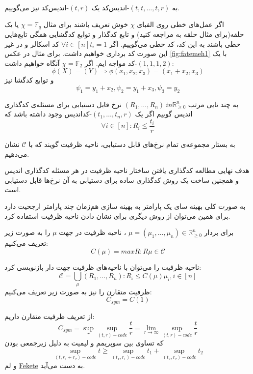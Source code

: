	به 
	$(t, t, \ldots, t, r)$-اندیس‌کد
	یک
	$(t, r)$-اندیس‌کد
	نیز می‌گوییم.
	
	اگر عمل‌های خطی روی الفبای
	$\chi$
	خوش تعریف باشند برای مثال
	$\chi = \mathbb{F}_q$
	یا یک حلقه(برای مثال حلقه به 
	\cite{Connelly2018}
	مراجعه کنید) و تابع کدگذار و توابع کدگشایی همگی تابع‌هایی خطی باشند به این کد، کد خطی می‌گوییم. اگر 
	$\forall i \in [n] t_i = 1$
	کد اسکالر و در غیر این صورت کد برداری خواهیم داشت. برای مثال در عکس 
	\ref{fig:fatemeh1}
	با یک 
	$(1, 1, 1, 2)$-کد
	مواجه ایم. اگر
	$\chi = \mathbb{F}_2$
	آنگاه خواهیم داشت:
	$$\phi(X) = (Y) \Rightarrow \phi(x_1, x_2, x_3) = (x_1 + x_2, x_3)$$
	و توابع کدگشا نیز
	$$\psi_1 = y_1 + x_2, \psi_2 = y_1 + x_3, \psi_3 = y_2$$
	\begin{definition}
		به چند تایی مرتب
		$(R_1, \ldots, R_n) \ in \mathbb{R}_{\geqslant 0}^n$
		نرخ قابل دستیابی برای مسئله‌ی کدگذاری اندیس گوییم اگر یک 
		$(t_1, \ldots, t_n, r)$-کداندیس
		وجود داشته باشد که
		$$\forall i \in [n]: R_i \leq \frac{t_i}{r}$$
		
		به بستار مجموعه‌ی تمام نرخ‌های قابل دستیابی، ناحیه ظرفیت گویند که با
		$\mathscr{C}$
		نشان می‌دهیم.
	\end{definition}
	
	هدف نهایی  مطالعه کدگذاری یافتن ساختار ناحیه ظرفیت در هر مسئله کدگذاری اندیس و همچنین ساخت یک روش کدگذاری ساده برای دستیابی به آن نرخ‌ها قابل دستیابی است.
	
	به صورت کلی بهینه سای یک پارامتر به بهینه سازی هم‌زمان چند پارامتر ارجحیت دارد برای همین می‌توان از روش دیگری برای نشان دادن ناحیه ظرفیت استفاده کرد.
	\begin{definition}
	برای بردار
	$\mu = (\mu_1, \ldots, \mu_n) \in \mathbb{R}_{\geqslant 0}^n $
	، ناحیه ظرفیت در جهت
	$\mu$
	را به صورت زیر تعریف می‌کنیم:
	$$C(\mu) = max {R: R \mu \in \mathscr{C}}$$
\end{definition}

\begin{remark}
	ناحیه ظرفیت را می‌توان با ناحیه‌های ظرفیت جهت دار بازنویسی کرد:
	$$\mathscr{C} = \bigcup\limits_{\mu} {(R_1, \ldots, R_n): R_i \leq C(\mu) \mu_i, i \in [n]}$$
	ظرفیت متقارن را نیز به صورت زیر تعریف می‌کنیم:
	$$C_{sym} = C(1) $$
\end{remark}

از تعریف ظرفیت متقارن داریم:
$$C_{sym}= \sup\limits_{r} \sup_{(t, r)-code} \dfrac{t}{r} = \lim\limits_{r \rightarrow \infty} \sup_{(t, r)-code} \dfrac{t}{r} $$
که تساوی بین سوپریمم و لیمیت به دلیل زیرجمعی بودن
$$\sup_{(t, r_1 + r_2)-code} t \geqslant \sup_{(t_1, r_1)-code} t_1 + \sup_{(t_2, r_2)-code} t_2$$
و لم
\href{https://en.wikipedia.org/wiki/Subadditivity}{Fekete}
به دست می‌آید.

